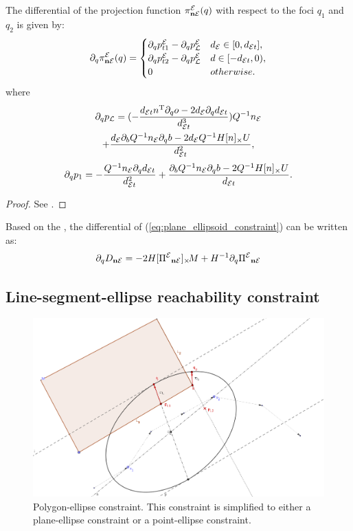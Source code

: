 \documentclass[journal]{IEEEtran}  %
\begin{document}
  \begin{proposition}\label{prop:dpi_ne_dt}
    The differential of the projection function $\pi^{\mathcal{E}}_{\mathbf{n} \mathcal{E}}(q)$ with respect to the foci $q_1$ and $q_2$ is given by:
    \begin{equation}
      \partial_q \pi^{\mathcal{E}}_{\mathbf{n} \mathcal{E}}(q) = \begin{cases}
        \partial_q p^{\mathcal{E}}_{t1}-\partial_q p^{\mathcal{E}}_{\mathcal{L}} &  d_{\mathcal{E}} \in [0, d_{\mathcal{E} t}], \\
        \partial_q p^{\mathcal{E}}_{t2}-\partial_q p^{\mathcal{E}}_{\mathcal{L}} &  d \in [- d_{\mathcal{E} t},0), \\
        {0} & otherwise.
      \end{cases}
    \end{equation}
    where
    \begin{multline}
      \partial_q p_{\mathcal{L}} =   (-\frac{d_{\mathcal{E} t} n^\mathrm{T} \partial_q o -2d_{\mathcal{E}} \partial_q d_{\mathcal{E} t}}{d_{\mathcal{E} t}^3} )Q^{-1}n_{\mathcal{E}} \\
      + \frac{d_{\mathcal{E}}\partial_b Q^{-1} n_{\mathcal{E}} \partial_q b -  2d_{\mathcal{E}} Q^{-1}H[n]_\times U}{d_{\mathcal{E} t}^2},
    \end{multline}
    \begin{equation}
      \partial_q p_{1} =  -\frac{Q^{-1}n_{\mathcal{E}} \partial_q d_{\mathcal{E} t} }{d_{\mathcal{E} t}^2} 
      + \frac{\partial_b Q^{-1}n_{\mathcal{E}} \partial_q b -  2Q^{-1}H[n]_\times U }{d_{\mathcal{E} t}}.
    \end{equation}
  \end{proposition}
  \begin{proof}
  See .
  \end{proof}
  Based on the , the differential of (\ref{eq:plane_ellipsoid_constraint}) can be written as:
  \begin{equation}
    \partial_q {D_{\mathbf{n}\mathcal{E}}} = -2 H [{\Pi^{\mathcal{E}}}_{\mathbf{n} \mathcal{E}}]_{\times}\!  M + H^{-1}\partial_q {\Pi^{\mathcal{E}}}_{\mathbf{n} \mathcal{E}}
  \end{equation}

\subsection{Line-segment-ellipse reachability constraint}\label{chapter:ellipse to segment}

\begin{figure}[htbp]
\begin{center}
\includegraphics[width=0.6\linewidth]{Ellipse2safezone_V2}
\caption{Polygon-ellipse constraint. This constraint is simplified to either a plane-ellipse constraint or a point-ellipse constraint.}
\label{fig:Ellipse-to-safezone}
\end{center}
\end{figure}
\end{document}
